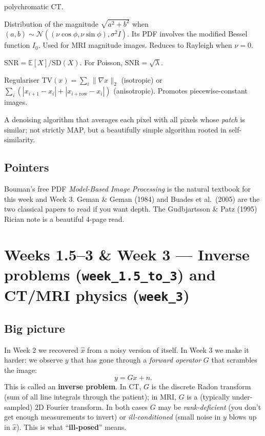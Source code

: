 \documentclass[11pt,a4paper]{article}
\newcommand{\E}{\mathbb{E}}
\begin{document}
\begin{description}[leftmargin=*]
        polychromatic CT.
  \item[\textbf{Rician distribution.}] Distribution of the magnitude
        $\sqrt{a^2 + b^2}$ when $(a,b) \sim \mathcal{N}((\nu\cos\phi,\nu\sin\phi),\sigma^2 I)$.
        Its PDF involves the modified Bessel function $I_0$. Used for
        MRI magnitude images. Reduces to Rayleigh when $\nu = 0$.
  \item[\textbf{Signal-to-noise ratio.}] $\mathrm{SNR} = \E[X] / \mathrm{SD}(X)$.
        For Poisson, $\mathrm{SNR} = \sqrt{\lambda}$.
  \item[\textbf{Total variation (TV).}] Regulariser
        $\mathrm{TV}(x) = \sum_i \|\nabla x\|_2$ (isotropic) or
        $\sum_i (|x_{i+1}-x_i| + |x_{i+\text{row}}-x_i|)$ (anisotropic).
        Promotes piecewise-constant images.
  \item[\textbf{Non-local means.}] A denoising algorithm that
        averages each pixel with all pixels whose \emph{patch} is
        similar; not strictly MAP, but a beautifully simple
        algorithm rooted in self-similarity.
\end{description}

\subsection{Pointers}

Bouman's free PDF \emph{Model-Based Image Processing} is the natural
textbook for this week and Week 3. Geman \& Geman (1984) and Buades et
al.\ (2005) are the two classical papers to read if you want depth.
The Gudbjartsson \& Patz (1995) Rician note is a beautiful 4-page
read.

\section{Weeks 1.5--3 \& Week 3 --- Inverse problems (\texttt{week\_1.5\_to\_3}) and CT/MRI physics (\texttt{week\_3})}

\subsection{Big picture}

In Week 2 we recovered $\hat x$ from a noisy version of itself.
In Week 3 we make it harder: we observe $y$ that has gone through a
\emph{forward operator} $G$ that scrambles the image:
\begin{equation}
  y = Gx + n.
  \label{eq:fwd}
\end{equation}
This is called an \textbf{inverse problem}. In CT, $G$ is the discrete
Radon transform (sum of all line integrals through the patient); in
MRI, $G$ is a (typically under-sampled) 2D Fourier transform. In both
cases $G$ may be \emph{rank-deficient} (you don't get enough
measurements to invert) or \emph{ill-conditioned} (small noise in
$y$ blows up in $\hat x$). This is what ``\textbf{ill-posed}'' means.
\end{document}
